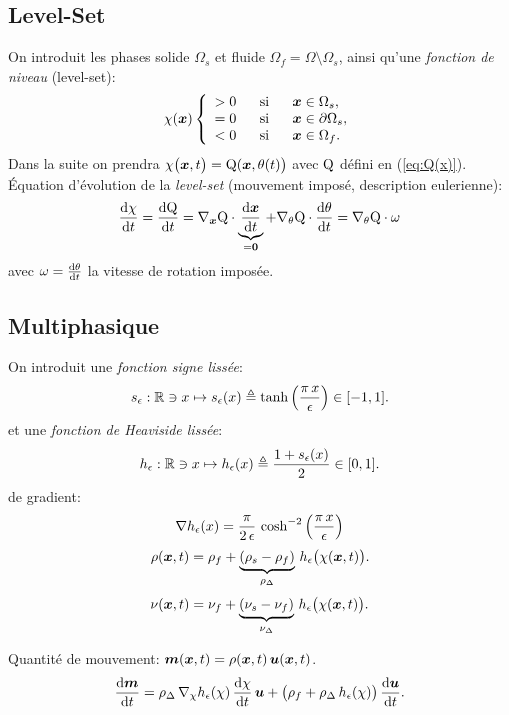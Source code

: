 \documentclass[10pt,a4paper]{article}
\begin{document}
\subsection{Level-Set}
%
On introduit les phases solide $\Omega_s$ et fluide $\Omega_f = \Omega\setminus\Omega_s$, ainsi qu'une \emph{fonction de niveau} (level-set):
%
\begin{equation}
\chi(\boldsymbol{x})\left\{
\begin{array}{lll}
> 0 & \mbox{~~si~~} & \boldsymbol{x}\in \Omega_s, \\
= 0& \mbox{~~si~~} & \boldsymbol{x}\in \partial\Omega_s, \\
< 0& \mbox{~~si~~} & \boldsymbol{x}\in \Omega_f.
\end{array}
\right.
\end{equation}
%
Dans la suite on prendra $\chi\big(\boldsymbol{x}, t\big)=\mathrm{Q}(\boldsymbol{x}, \theta(t)\big)$ avec $\mathrm{Q}$ défini en (\ref{eq:Q(x)}).
%
Équation d'évolution de la \textit{level-set} (mouvement imposé, description eulerienne):
\begin{equation}
\frac{\mathrm{d} \chi}{\mathrm{d} t} = \frac{\mathrm{d} \mathrm{Q}}{\mathrm{d} t} =\nabla_{\boldsymbol{x}}\mathrm{Q}\cdot\underbrace{\frac{\mathrm{d} \boldsymbol{x}}{\mathrm{d} t} }_{=\boldsymbol{0}}+ \nabla_\theta\mathrm{Q}\cdot\frac{\mathrm{d} \theta}{\mathrm{d} t} = \nabla_\theta\mathrm{Q} \cdot \omega
\end{equation}
%
avec $\omega = \frac{\mathrm{d} \theta}{\mathrm{d} t}$ la vitesse de rotation imposée.
%
%
\subsection{Multiphasique}
%
On introduit une \emph{fonction signe lissée}:
%
\begin{equation}
\label{eq:se}
s_{\epsilon}: \mathbb{R}\ni x \mapsto s_{\epsilon}(x) \triangleq \tanh\left(\frac{\pi \, x}{\epsilon} \right) \in [-1, 1].
\end{equation}
%
%
et une \emph{fonction de Heaviside lissée}:
%
\begin{equation}
\label{eq:he}
h_{\epsilon}: \mathbb{R}\ni x \mapsto h_{\epsilon}(x) \triangleq \frac{1 + s_{\epsilon}(x)}{2} \in [0, 1].
\end{equation}
%
%
de gradient:
%
\begin{equation}
\label{eq:grad_he}
\nabla h_{\epsilon}(x) = \frac{\pi}{2\,\epsilon}\,\cosh^{-2}\left(\frac{\pi\, x}{\epsilon}\right)
\end{equation}
$$\rho(\boldsymbol{x}, t)  = \rho_f +  \underbrace{(\rho_s- \rho_f)}_{\rho_\Delta}\,h_{\epsilon}\big(\chi(\boldsymbol{x}, t)\big).$$
$$\nu(\boldsymbol{x}, t)  = \nu_f +  \underbrace{(\nu_s- \nu_f)}_{\nu_\Delta}\,h_{\epsilon}\big(\chi(\boldsymbol{x}, t)\big).$$

Quantité de mouvement: $\boldsymbol{m}(\boldsymbol{x}, t) = \rho(\boldsymbol{x}, t)\,\boldsymbol{u}(\boldsymbol{x}, t)$.
$$ \frac{\mathrm{d} \boldsymbol{m} }{\mathrm{d} t} =\rho_\Delta\,\nabla_{\chi}h_{\epsilon}(\chi)\,\frac{\mathrm{d} \chi}{\mathrm{d} t}\, \boldsymbol{u} + \big(\rho_f + \rho_\Delta\,h_{\epsilon}(\chi)\big)\,\frac{\mathrm{d} \boldsymbol{u}}{\mathrm{d} t}.$$
\end{document}
